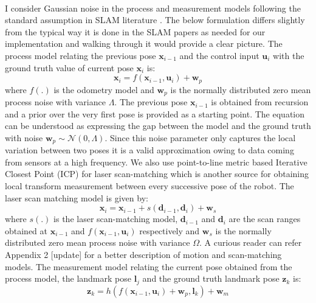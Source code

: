 \paragraph{}
I consider Gaussian noise in the process and measurement models following the standard assumption in SLAM literature \cite{thrunprobabilistic}. The below formulation differs slightly from the typical way it is done in the SLAM papers as needed for our implementation and walking through it would provide a clear picture. The process model relating the previous pose $\textbf{x}_{i-1}$ and the control input $\textbf{u}_i$ with the ground truth value of current pose $\textbf{x}_i$ is: 
\begin{equation}
\textbf{x}_i = f(\textbf{x}_{i-1},\textbf{u}_i) + \textbf{w}_p
\label{eq:procmod}
\end{equation}
where $f(.)$ is the odometry model and $\textbf{w}_p$ is the normally distributed zero mean process noise with variance $\Lambda$. The previous pose $\textbf{x}_{i-1}$ is obtained from recursion and a prior over the very first pose is provided as a starting point. The equation can be understood as expressing the gap between the model and the ground truth with noise $\textbf{w}_p \sim \mathcal{N}(0,\Lambda)$. Since this noise parameter only captures the local variation between two poses it is a valid approximation owing to data coming from sensors at a high frequency. We also use point-to-line metric based Iterative Closest Point (ICP) \cite{csmicp} for laser scan-matching which is another source for obtaining local transform measurement between every successive pose of the robot. The laser scan matching model is given by:
\begin{equation}
\textbf{x}_i = \textbf{x}_{i-1} + s(\textbf{d}_{i-1}, \textbf{d}_i) + \textbf{w}_s
\label{eq:scanmod}
\end{equation}
where $s(.)$ is the laser scan-matching model, $\textbf{d}_{i-1}$ and $\textbf{d}_{i}$ are the scan ranges obtained at $\textbf{x}_{i-1}$ and $f(\textbf{x}_{i-1}, \textbf{u}_i)$ respectively and $\textbf{w}_s$ is the normally distributed zero mean process noise with variance $\Omega$. A curious reader can refer Appendix 2 [update] for a better description of motion and scan-matching models. The measurement model relating the current pose obtained from the process model, the landmark pose $\textbf{l}_j$ and the ground truth landmark pose $\textbf{z}_k$ is:
\begin{equation}
\textbf{z}_k = h(f(\textbf{x}_{i-1}, \textbf{u}_i) + \textbf{w}_p, \textbf{l}_k) + \textbf{w}_m
\label{eq:measmod}
\end{equation}
